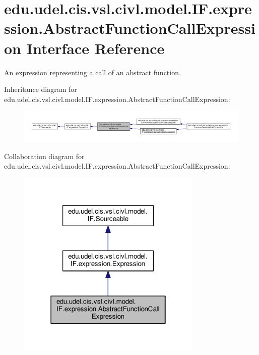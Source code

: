 \hypertarget{interfaceedu_1_1udel_1_1cis_1_1vsl_1_1civl_1_1model_1_1IF_1_1expression_1_1AbstractFunctionCallExpression}{}\section{edu.\+udel.\+cis.\+vsl.\+civl.\+model.\+I\+F.\+expression.\+Abstract\+Function\+Call\+Expression Interface Reference}
\label{interfaceedu_1_1udel_1_1cis_1_1vsl_1_1civl_1_1model_1_1IF_1_1expression_1_1AbstractFunctionCallExpression}


An expression representing a call of an abstract function.  




Inheritance diagram for edu.\+udel.\+cis.\+vsl.\+civl.\+model.\+I\+F.\+expression.\+Abstract\+Function\+Call\+Expression\+:
\nopagebreak
\begin{figure}[H]
\begin{center}
\leavevmode
\includegraphics[width=350pt]{interfaceedu_1_1udel_1_1cis_1_1vsl_1_1civl_1_1model_1_1IF_1_1expression_1_1AbstractFunctionCallExpression__inherit__graph}
\end{center}
\end{figure}


Collaboration diagram for edu.\+udel.\+cis.\+vsl.\+civl.\+model.\+I\+F.\+expression.\+Abstract\+Function\+Call\+Expression\+:
\nopagebreak
\begin{figure}[H]
\begin{center}
\leavevmode
\includegraphics[width=250pt]{interfaceedu_1_1udel_1_1cis_1_1vsl_1_1civl_1_1model_1_1IF_1_1expression_1_1AbstractFunctionCallExpression__coll__graph}
\end{center}
\end{figure}
